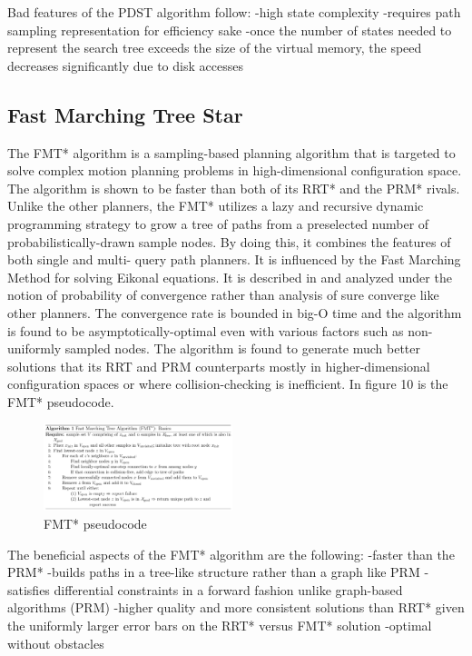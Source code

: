 \documentclass[conference]{IEEEtran} \usepackage[T1]{fontenc} \usepackage[backend=biber, style=ieee]{biblatex}
\begin{document}
Bad features of the PDST algorithm follow:
-high state complexity
-requires path sampling representation for efficiency sake
-once the number of states needed to represent the search tree exceeds the size of the virtual memory, the speed decreases significantly due to disk accesses

\subsection{Fast Marching Tree Star} \label{FMT*}
The FMT* algorithm is a sampling-based planning algorithm that is targeted to solve complex motion planning problems in high-dimensional configuration space. The
algorithm is shown to be faster than both of its RRT* and the PRM* rivals. Unlike the other planners, the FMT* utilizes a lazy and recursive dynamic programming 
strategy to grow a tree of paths from a preselected number of probabilistically-drawn sample nodes. By doing this, it combines the features of both single and multi-
query path planners. It is influenced by the Fast Marching Method for solving Eikonal equations. It is described in \cite{fmt_star} and analyzed under the
notion of probability of convergence rather than analysis of sure converge like other planners. The convergence rate is bounded in big-O time and the algorithm
is found to be asymptotically-optimal even with various factors such as non-uniformly sampled nodes. The algorithm is found to generate much better solutions
that its RRT and PRM counterparts mostly in higher-dimensional configuration spaces or where collision-checking is inefficient. In figure 10 is the FMT* pseudocode.

\begin{figure}
\label{figure10} 
\centering 
\includegraphics[width=0.49\textwidth]{fmt_star}
\caption{FMT* pseudocode}
\end{figure}

The beneficial aspects of the FMT* algorithm are the following:
-faster than the PRM*
-builds paths in a tree-like structure rather than a graph like PRM
-satisfies differential constraints in a forward fashion unlike graph-based algorithms (PRM)
-higher quality and more consistent solutions than RRT* given the uniformly larger error bars on the RRT* versus FMT* solution
-optimal without obstacles
\end{document}
